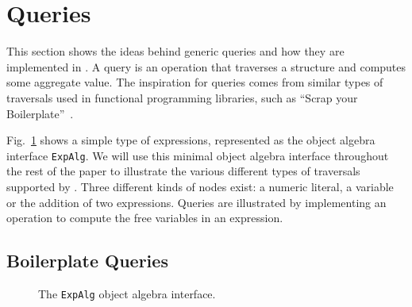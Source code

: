 \section{Queries}\label{sec:queries}

This section shows the ideas behind generic queries and how they are
implemented in \Name.  A query is an operation that traverses a
structure and computes some aggregate value. The inspiration for
queries comes from similar types of traversals used in functional
programming libraries, such as ``Scrap your
Boilerplate''~\cite{ralf03syb}.


Fig.~\ref{exp_alg} shows a simple type of expressions, represented
as the object algebra interface \lstinline{ExpAlg}. We will use this
minimal object algebra interface throughout the rest of the paper to
illustrate the various different types of traversals supported by
\Name.  Three different kinds of nodes exist: a numeric literal, a
variable or the addition of two expressions. Queries are illustrated
by implementing an operation to compute the free variables in an expression.

\begin{comment}
As a specific type of object algebras, queries allow users to define
new operations handling a user-defined data structure\bruno{This
  definition of queries is just too broad. Please
look at papers like Syb to see how they describe queries and transformations}. A \textit{query
  algebra} is a class implementing an object algebra interface by a
top-down traversal throughout the hierarchy. It is something
supporting the program to gather information from the substructures of
a data type recursively, and make a response at the root node to the
query.
\end{comment}

\subsection{Boilerplate Queries}\label{subsec:freevars}

\begin{figure}[t]
\vspace{-.1in}
\caption{The \lstinline{ExpAlg} object algebra interface.}
\label{exp_alg}
\end{figure}

